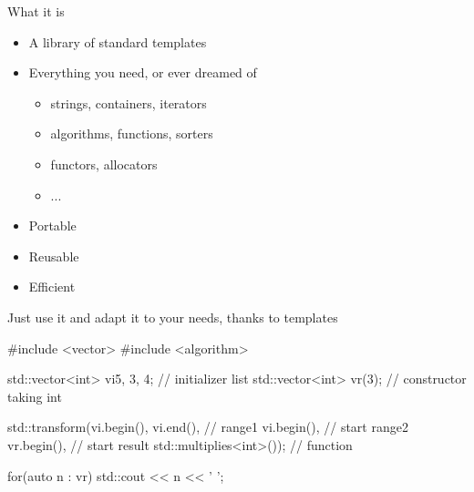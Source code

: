 \begin{frame}[fragile]
  \begin{block}{What it is}
    \begin{itemize}
    \item A library of standard templates
    \item Everything you need, or ever dreamed of
      \begin{itemize}
      \item strings, containers, iterators
      \item algorithms, functions, sorters
      \item functors, allocators
      \item ...
      \end{itemize}
    \item Portable
    \item Reusable
    \item Efficient
    \end{itemize}
  \end{block}
  \pause
  \begin{alertblock}{Just use it}
    and adapt it to your needs, thanks to templates
  \end{alertblock}
\end{frame}

\begin{frame}[fragile,label=STLcode]
  \begin{cppcode*}{}
    #include <vector>
    #include <algorithm>

    std::vector<int> vi{5, 3, 4}; // initializer list
    std::vector<int> vr(3); // constructor taking int

    std::transform(vi.begin(), vi.end(),      // range1
                   vi.begin(),          // start range2
                   vr.begin(),          // start result
                   std::multiplies<int>()); // function

    for(auto n : vr) {
      std::cout << n << ' ';
    }
  \end{cppcode*}
\end{frame}

